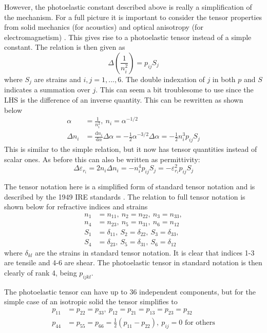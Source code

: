 \documentclass[10pt,a4paper,twocolumn,draft]{scrartcl}
\begin{document}
	However, the photoelastic constant described above is really a simplification of the mechanism. For a full picture it is important to consider the tensor properties from solid mechanics (for acoustics) and optical anisotropy (for electromagnetism) \cite{Korpel1988}. This gives rise to a photoelastic tensor instead of a simple constant. The relation is then given as \cite{Korpel1988}
	\begin{equation*}
		\Delta \left( \frac{1}{n_i^2} \right) = p_{ij} S_j
	\end{equation*}
	where $S_j$ are strains and $i,j = 1,...,6$. The double indexation of $j$ in both $p$ and $S$ indicates a summation over $j$. This can seem a bit troublesome to use since the LHS is the difference of an inverse quantity. This can be rewritten as shown below
	\begin{align*}
		\alpha &= \frac{1}{n_i^2},\ n_i = \alpha^{-1/2} \\
		\Delta n_i &= \frac{\mathrm{d}n_i}{\mathrm{d}\alpha} \Delta \alpha = -\frac{1}{2} \alpha^{-3/2} \Delta \alpha = -\frac{1}{2} n_i^3 p_{ij} S_j
	\end{align*}
	This is similar to the simple relation, but it now has tensor quantities instead of scalar ones. As before this can also be written as permittivity:
	\begin{equation*}
		\Delta \varepsilon_{r_i} = 2n_i\Delta n_i = -n_i^4 p_{ij} S_j = -\varepsilon_{r_i}^2 p_{ij} S_j
	\end{equation*}
	
	The tensor notation here is a simplified form of standard tensor notation and is described by the 1949 IRE standards \cite{Korpel1988}.  The relation to full tensor notation is shown below for refractive indices and strains \cite{Korpel1988}
	\begin{align*}
		n_1 &= n_{11},\ n_2 = n_{22},\ n_3 = n_{33}, \\
		n_4 &= n_{23},\ n_5 = n_{31},\ n_6 = n_{12} \\
		S_1 &= \delta_{11},\ S_2 = \delta_{22},\ S_3 = \delta_{33}, \\
		S_4 &= \delta_{23},\ S_5 = \delta_{31},\ S_6 = \delta_{12}
	\end{align*}
	where $\delta_{kl}$ are the strains in standard tensor notation. It is clear that indices 1-3 are tensile and 4-6 are shear. The photoelastic tensor in standard notation is then clearly of rank 4, being $p_{ijkl}$.
	
	The photoelastic tensor can have up to 36 independent components, but for the simple case of an isotropic solid the tensor simplifies to \cite{Korpel1988}
	\begin{align*}
		p_{11} &= p_{22} = p_{33}, \ p_{12} = p_{21} = p_{13} = p_{23} = p_{32}\\
		p_{44} &= p_{55} = p_{66} = \frac{1}{2} (p_{11} - p_{22}), \ p_{ij} = 0 \text{ for others}
	\end{align*}
	
\end{document}
